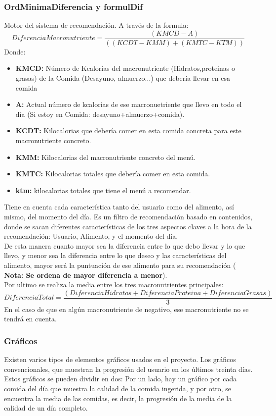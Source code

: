 \subsubsection{OrdMinimaDiferencia y  formulDif}
Motor del sistema de recomendación. A través de la formula:
\begin{equation}
DiferenciaMacronutriente = \frac{(KMCD - A)}{((KCDT-KMM)+(KMTC-KTM))}
\end{equation}
Donde:
\begin{itemize}
\item \textbf{KMCD:} Número de Kcalorias del macronutriente (Hidratos,proteinas o grasas) de la Comida (Desayuno, almuerzo...) que debería llevar en esa comida
\item \textbf{A:} Actual número de kcalorias de ese macronuetriente que llevo en todo el día (Si estoy en Comida: desayuno+almuerzo+comida).
\item \textbf{KCDT:} Kilocalorias que debería comer en esta comida concreta para este macronutriente concreto.
\item \textbf{KMM:} Kilocalorias del macronutriente concreto del menú.
\item \textbf{KMTC:} Kilocalorias totales que debería comer en esta comida.
\item \textbf{ktm:} kilocalorias totales que tiene el menú a recomendar.

\end{itemize}
Tiene en cuenta cada característica tanto del usuario como del alimento, así mismo, del momento del día. Es un filtro de recomendación basado en contenidos, donde se sacan diferentes características de los tres aspectos claves a la hora de la recomendación: Usuario, Alimento, y el momento del día.\\
De esta manera cuanto mayor sea la diferencia entre lo que debo llevar y lo que llevo, y menor sea la diferencia entre lo que deseo y las características del alimento, mayor será la puntuación de ese alimento para su recomendación ( \textbf{Nota: Se ordena de mayor diferencia a menor}).\\
Por ultimo se realiza la media entre los tres macronutrientes principales:
\begin{equation}
DiferenciaTotal = \frac{(DiferenciaHidratos+DiferenciaProteina+DiferenciaGrasas)}{3}
\end{equation} 
En el caso de que en algún macronutriente de negativo, ese macronutriente no se tendrá en cuenta.
\subsubsection{Gráficos}
Existen varios tipos de elementos gráficos usados en el proyecto. Los gráficos convencionales, que muestran la progresión del usuario en los últimos treinta días. Estos gráficos se pueden dividir en dos: Por un lado, hay un gráfico por cada comida del día que muestra la calidad de la comida ingerida, y por otro, se encuentra la media de las comidas, es decir, la progresión de la media de la calidad de un día completo.\\

